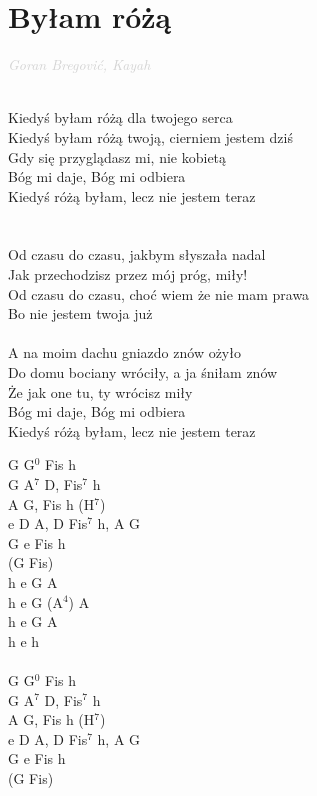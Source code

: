 \documentclass[a5paper, 10pt]{book}
\begin{document}
\section{Byłam różą}\textcolor{lightgray}{\textit{Goran Bregović, Kayah}}\\~\\
\begin{minipage}[t]{0.65\textwidth}
  Kiedyś byłam różą dla twojego serca\\
  Kiedyś byłam różą twoją, cierniem jestem dziś\\
  Gdy się przyglądasz mi, nie kobietą\\
  Bóg mi daje, Bóg mi odbiera\\
  Kiedyś różą byłam, lecz nie jestem teraz\\
  \\
  \\
  \hspace*{5mm}Od czasu do czasu, jakbym słyszała nadal\\
  \hspace*{5mm}Jak przechodzisz przez mój próg, miły!\\
  \hspace*{5mm}Od czasu do czasu, choć wiem że nie mam prawa\\
  \hspace*{5mm}Bo nie jestem twoja już\\
  \\
  A na moim dachu gniazdo znów ożyło\\
  Do domu bociany wróciły, a ja śniłam znów\\
  Że jak one tu, ty wrócisz miły\\
  Bóg mi daje, Bóg mi odbiera\\
  Kiedyś różą byłam, lecz nie jestem teraz\\
\end{minipage}
\begin{minipage}[t]{0.35\textwidth}
  G G$^0$ Fis h\\
  G A$^7$ D, Fis$^7$ h\\
  A G, Fis h (H$^7$)\\
  e D A, D Fis$^7$ h, A G\\
  G e Fis h\\
  (G Fis)\\

  h e G A\\
  h e G (A$^4$) A\\
  h e G A\\
  h e h \\
  \\
  G G$^0$ Fis h\\
  G A$^7$ D, Fis$^7$ h\\
  A G, Fis h (H$^7$)\\
  e D A, D Fis$^7$ h, A G\\
  G e Fis h\\
  (G Fis)\\
\end{minipage}
\end{document}
